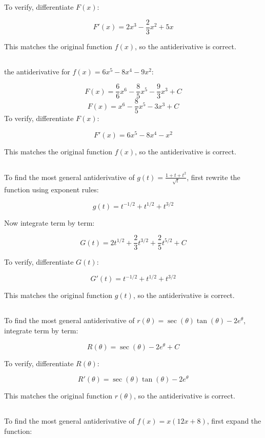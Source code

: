 \documentclass{article}
\begin{document}
To verify, differentiate \( F(x) \):

\[
F'(x) = 2x^3 - \frac{2}{3}x^2 + 5x
\]

This matches the original function \( f(x) \), so the antiderivative is correct.
\subsection{}
the antiderivative for \( f(x) = 6x^5 - 8x^4 - 9x^2 \):

\[
F(x) = \frac{6}{6}x^6 - \frac{8}{5}x^5 - \frac{9}{3}x^3 + C
\]
\[
F(x) = x^6 - \frac{8}{5}x^5 - 3x^3 + C
\]
To verify, differentiate \( F(x) \):

\[
F'(x) = 6x^5 - 8x^4 - x^2
\]

This matches the original function \( f(x) \), so the antiderivative is correct.
\subsection{}
To find the most general antiderivative of \( g(t) = \frac{1 + t + t^2}{\sqrt{t}} \), first rewrite the function using exponent rules:

\[
g(t) = t^{-1/2} + t^{1/2} + t^{3/2}
\]

Now integrate term by term:

\[
G(t) = 2t^{1/2} + \frac{2}{3}t^{3/2} + \frac{2}{5}t^{5/2} + C
\]

To verify, differentiate \( G(t) \):

\[
G'(t) = t^{-1/2} + t^{1/2} + t^{3/2}
\]

This matches the original function \( g(t) \), so the antiderivative is correct.
\subsection{}
To find the most general antiderivative of \( r(\theta) = \sec(\theta)\tan(\theta) - 2e^\theta \), integrate term by term:

\[
R(\theta) = \sec(\theta) - 2e^\theta + C
\]

To verify, differentiate \( R(\theta) \):

\[
R'(\theta) = \sec(\theta)\tan(\theta) - 2e^\theta
\]

This matches the original function \( r(\theta) \), so the antiderivative is correct.
\subsection{}
To find the most general antiderivative of \( f(x) = x(12x + 8) \), first expand the function:
\end{document}
